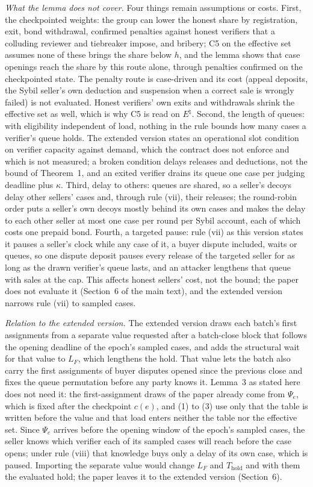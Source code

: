 \documentclass[10pt,a4paper]{article}
\newcommand{\Thold}{T_{\mathrm{hold}}}
\theoremstyle{plain}
\theoremstyle{remark}
\begin{document}
\emph{What the lemma does not cover.} Four things remain assumptions or costs. First, the checkpointed weights: the group can lower the honest share by registration, exit, bond withdrawal, confirmed penalties against honest verifiers that a colluding reviewer and tiebreaker impose, and bribery; C5 on the effective set assumes none of these brings the share below $h$, and the lemma shows that case openings reach the share by this route alone, through penalties confirmed on the checkpointed state. The penalty route is case-driven and its cost (appeal deposits, the Sybil seller's own deduction and suspension when a correct sale is wrongly failed) is not evaluated. Honest verifiers' own exits and withdrawals shrink the effective set as well, which is why C5 is read on $E^\natural$. Second, the length of queues: with eligibility independent of load, nothing in the rule bounds how many cases a verifier's queue holds. The extended version states an operational slot condition on verifier capacity against demand, which the contract does not enforce and which is not measured; a broken condition delays releases and deductions, not the bound of Theorem~1, and an exited verifier drains its queue one case per judging deadline plus $\kappa$. Third, delay to others: queues are shared, so a seller's decoys delay other sellers' cases and, through rule (vii), their releases; the round-robin order puts a seller's own decoys mostly behind its own cases and makes the delay to each other seller at most one case per round per Sybil account, each of which costs one prepaid bond. Fourth, a targeted pause: rule (vii) as this version states it pauses a seller's clock while any case of it, a buyer dispute included, waits or queues, so one dispute deposit pauses every release of the targeted seller for as long as the drawn verifier's queue lasts, and an attacker lengthens that queue with sales at the cap. This affects honest sellers' cost, not the bound; the paper does not evaluate it (Section~6 of the main text), and the extended version narrows rule (vii) to sampled cases.

\emph{Relation to the extended version.} The extended version draws each batch's first assignments from a separate value requested after a batch-close block that follows the opening deadline of the epoch's sampled cases, and adds the structural wait for that value to $L_F$, which lengthens the hold. That value lets the batch also carry the first assignments of buyer disputes opened since the previous close and fixes the queue permutation before any party knows it. Lemma~3 as stated here does not need it: the first-assignment draws of the paper already come from $\Psi_e$, which is fixed after the checkpoint $c(e)$, and (1) to (3) use only that the table is written before the value and that load enters neither the table nor the effective set. Since $\Psi_e$ arrives before the opening window of the epoch's sampled cases, the seller knows which verifier each of its sampled cases will reach before the case opens; under rule (viii) that knowledge buys only a delay of its own case, which is paused. Importing the separate value would change $L_F$ and $\Thold$ and with them the evaluated hold; the paper leaves it to the extended version (Section~6).
\end{document}
